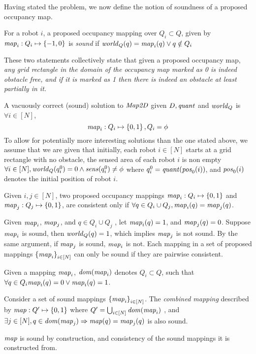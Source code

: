 
Having stated the problem, we now define the notion of soundness of a proposed occupancy map.
\begin{definition}
    \label{soundness}
    For a robot $i$, a proposed occupancy mapping over $Q_i\subset Q$, given by $\mathit{map}_i: Q_i \mapsto \left\{-1,0\right\}$ is \emph{sound} if
     $\mathit{world}_Q(q) =  \mathit{map}_i(q) \vee q\notin Q_i$
\end{definition}


These two statements collectively state that given a proposed occupancy map, \emph{any grid rectangle in the domain of the occupancy map marked as 0 is indeed obstacle free, and if it is marked as 1 then there is indeed an obstacle at least partially in it.}



A vacuously correct (sound) solution to $\mathit{Map2D}$ given $D, \mathit{quant}$ and $\mathit{world}_Q$ is $\forall i \in [N]$, $$\mathit{map}_i : Q_i \mapsto \left\{0,1\right\}, Q_i = \phi$$ To allow for potentially more interesting solutions than the one stated above, we assume that we are given that initially, each robot $i\in[N]$ starts at a grid rectangle with no obstacle, the sensed area of each robot $i$ is non empty
$\forall i \in [N], \mathit{world}_Q(q^0_i) = 0\wedge \mathit{sens}(q^0_i) \neq \phi$
where $q^0_i = \mathit{quant}(\mathit{pos}_0(i))$, and $\mathit{pos}_0(i)$ denotes the initial position of robot $i$.


\begin{definition}
    Given  $i , j \in [N]$, two proposed occupancy mappings $\mathit{map}_i: Q_i\mapsto\left\{0,1\right\}$ and $\mathit{map}_j: Q_j\mapsto \left\{0,1\right\}$, are consistent only if $\forall q \in Q_i \cup Q_j, \mathit{map}_i(q) = \mathit{map}_j(q)$.
\end{definition}

    Given $\mathit{map}_i$, $\mathit{map}_j$, and $q\in Q_i \cup Q_j$ , let $\mathit{map}_i(q) = 1$, and $\mathit{map}_j(q) = 0$. Suppose $\mathit{map}_i$ is sound, then $\mathit{world}_Q(q) = 1$, which implies $\mathit{map}_j$ is not sound. By the same argument, if $\mathit{map}_j$ is sound, $\mathit{map}_i$ is not. Each mapping in a set of proposed mappings $\left\{\mathit{map}_i\right\}_{i\in [N]}$ can only be sound if they are pairwise consistent.

Given a mapping $\mathit{map}_i$, $\mathit{dom}(\mathit{map}_i)$ denotes $ Q_i \subset Q$, such that $\forall q \in Q_i \mathit{map}_i(q) = 0 \vee \mathit{map}_i(q) = 1$.
\begin{definition}
    \label{cons}
Consider a set of sound mappings $\left\{\mathit{map}_i\right\}_{i\in[N]}$. The \emph{ combined mapping} described by $\mathit{map}: Q^\prime \mapsto \left\{0,1\right\}$ where $Q^\prime = \bigcup_{i\in[N]} \mathit{dom}(\mathit{map}_i)$ , and $\exists j \in [N], q\in \mathit{dom}(\mathit{map}_j)\Rightarrow \mathit{map}(q) = \mathit{map}_j(q)$ is also sound.
\end{definition}

$\mathit{map}$ is sound by construction, and consistency of the sound mappings it is constructed from.
